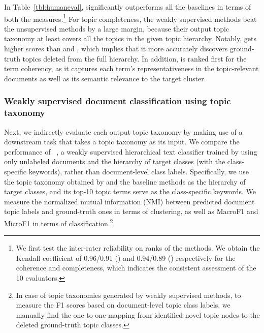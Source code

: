In Table~\ref{tbl:humaneval}, \proposed significantly outperforms all the baselines in terms of both the measures.\footnote{We first test the inter-rater reliability on ranks of the methods. We obtain the Kendall coefficient of 0.96/0.91 (\nyt) and 0.94/0.89 (\arxiv) respectively for the coherence and completeness, which indicates the consistent assessment of the 10 evaluators.}
For topic completeness, the weakly supervised methods beat the unsupervised methods by a large margin, because their output topic taxonomy at least covers all the topics in the given topic hierarchy.
Notably, \proposed gets higher scores than \josh and \corel, which implies that it more accurately discovers ground-truth topics deleted from the full hierarchy.
In addition, \proposed is ranked first for the term coherency, as it captures each term's representativeness in the topic-relevant documents as well as its semantic relevance to the target cluster.

\subsubsection{Weakly supervised document classification using topic taxonomy}
\label{subsubsec:weshclass}
Next, we indirectly evaluate each output topic taxonomy by making use of a downstream task that takes a topic taxonomy as its input.
We compare the performance of \weshclass~\cite{meng2019weakly}, a weakly supervised hierarchical text classifier trained by using only unlabeled documents and the hierarchy of target classes (with the class-specific keywords), rather than document-level class labels.
Specifically, we use the topic taxonomy obtained by \proposed and the baseline methods as the hierarchy of target classes, and its top-10 topic terms serve as the class-specific keywords.
We measure the normalized mutual information (NMI) between predicted document topic labels and ground-truth ones in terms of clustering, as well as MacroF1 and MicroF1 in terms of classification.\footnote{In case of topic taxonomies generated by weakly supervised methods, to measure the F1 scores based on document-level topic class labels, we manually find the one-to-one mapping from identified novel topic nodes to the deleted ground-truth topic classes.}

